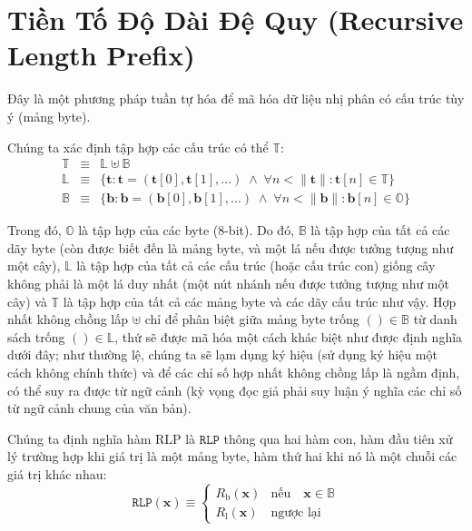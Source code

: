 \documentclass[9pt,oneside]{amsart}
\begin{document}
\section{Tiền Tố Độ Dài Đệ Quy (Recursive Length Prefix)}\label{app:rlp}\hypertarget{rlp}{}
Đây là một phương pháp tuần tự hóa để mã hóa dữ liệu nhị phân có cấu trúc tùy ý (mảng byte).

Chúng ta xác định tập hợp các cấu trúc có thể $\mathbb{T}$:
\begin{eqnarray}
\mathbb{T} & \equiv & \mathbb{L} \uplus \mathbb{B} \\
\mathbb{L} & \equiv & \{ \mathbf{t}: \mathbf{t} = ( \mathbf{t}[0], \mathbf{t}[1], ... ) \; \wedge \; \forall n < \lVert \mathbf{t} \rVert : \mathbf{t}[n] \in \mathbb{T} \} \\
\mathbb{B} & \equiv & \{ \mathbf{b}: \mathbf{b} = ( \mathbf{b}[0], \mathbf{b}[1], ... ) \; \wedge \; \forall n < \lVert \mathbf{b} \rVert : \mathbf{b}[n] \in \mathbb{O} \}
\end{eqnarray}

Trong đó, $\mathbb{O}$ là tập hợp của các byte (8-bit). Do đó, $\mathbb{B}$ là tập hợp của tất cả các dãy byte (còn được biết đến là mảng byte, và một lá nếu được tưởng tượng như một cây), $\mathbb{L}$ là tập hợp của tất cả các cấu trúc (hoặc cấu trúc con) giống cây không phải là một lá duy nhất (một nút nhánh nếu được tưởng tượng như một cây) và $\mathbb{T}$ là tập hợp của tất cả các mảng byte và các dãy cấu trúc như vậy. Hợp nhất không chồng lấp $\uplus$ chỉ để phân biệt giữa mảng byte trống $()\in\mathbb{B}$ từ danh sách trống $()\in\mathbb{L}$, thứ sẽ được mã hóa một cách khác biệt như được định nghĩa dưới đây; như thường lệ, chúng ta sẽ lạm dụng ký hiệu (sử dụng ký hiệu một cách không chính thức) và để các chỉ số hợp nhất không chồng lấp là ngầm định, có thể suy ra được từ ngữ cảnh (kỳ vọng đọc giả phải suy luận ý nghĩa các chỉ số từ ngữ cảnh chung của văn bản).

Chúng ta định nghĩa hàm RLP là $\mathtt{RLP}$ thông qua hai hàm con, hàm đầu tiên xử lý trường hợp khi giá trị là một mảng byte, hàm thứ hai khi nó là một chuỗi các giá trị khác nhau:
\begin{equation}
\mathtt{RLP}(\mathbf{x}) \equiv \begin{cases} R_{\mathrm{b}}(\mathbf{x}) & \text{nếu} \quad \mathbf{x} \in \mathbb{B} \\ R_{\mathrm{l}}(\mathbf{x}) & \text{ngược lại} \end{cases}
\end{equation}
\end{document}
